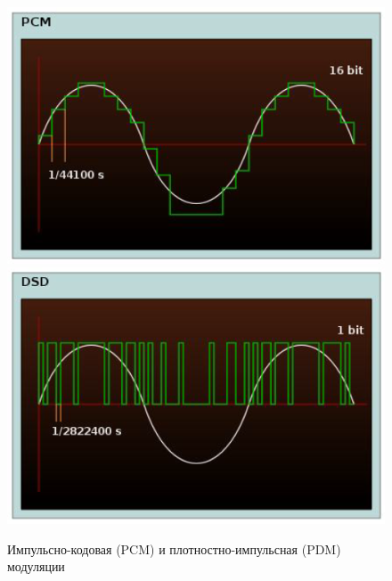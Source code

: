 	\begin{figure}[H]
		\centering
		\begin{minipage}[t]{0.48\linewidth}
			\centering
			\includegraphics[width=\linewidth, height=0.2\textheight]{img/03_01}
		\end{minipage}%
		\hfill
		\begin{minipage}[t]{0.48\linewidth}
			\centering
			\includegraphics[width=\linewidth, height=0.2\textheight]{img/03_02}
		\end{minipage}
		\small{Импульсно-кодовая (PCM) и плотностно-импульсная (PDM) модуляции}
		\label{fig:03_combined}
	\end{figure}
	
